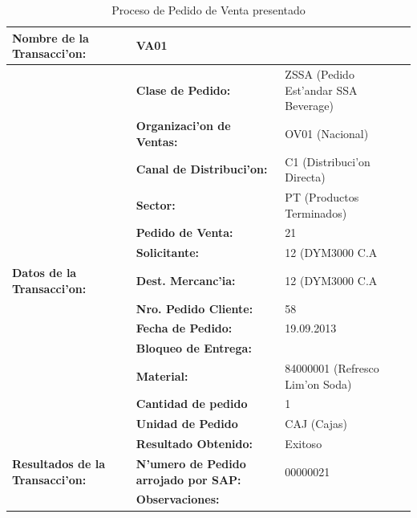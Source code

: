 \begin{table}[H]
\footnotesize
\scalebox{0.8} {
\begin{tabular}{l l l}
\toprule
\textbf{Nombre de la Transacci'on:} & VA01 &\\
\midrule
                 & \textbf{Clase de Pedido:} & ZSSA (Pedido Est'andar SSA Beverage) \\
                 \cmidrule{2-3}
                 & \textbf{Organizaci'on de Ventas:} & OV01 (Nacional) \\
                 \cmidrule{2-3}
                 & \textbf{Canal de Distribuci'on:} & C1 (Distribuci'on Directa) \\
                 \cmidrule{2-3}
                 & \textbf{Sector:}                   &   PT (Productos Terminados) \\
                 \cmidrule{2-3}
                 & \textbf{Pedido de Venta:}            & 21 \\
                 \cmidrule{2-3}
                 & \textbf{Solicitante:}              & 12 (DYM3000 C.A \\
                \cmidrule{2-3}
  \textbf{Datos de la Transacci'on:}              & \textbf{Dest. Mercanc'ia:}   &   12 (DYM3000 C.A \\
                 \cmidrule{2-3}
                 & \textbf{Nro. Pedido Cliente:} & 58      \\
                 \cmidrule{2-3}
                 & \textbf{Fecha de Pedido:} & 19.09.2013 \\
                 \cmidrule{2-3}
                 & \textbf{Bloqueo de Entrega:}  &      \\
                 \cmidrule{2-3}
                 & \textbf{Material:} & 84000001 (Refresco Lim'on Soda) \\
                 \cmidrule{2-3}
                 & \textbf{Cantidad de pedido} & 1 \\
                 \cmidrule{2-3}
                 & \textbf{Unidad de Pedido} & CAJ (Cajas) \\
                 \midrule
                 & \textbf{Resultado Obtenido:} & Exitoso \\
                 \cmidrule{2-3}
\textbf{Resultados de la Transacci'on:}    & \textbf{N'umero de Pedido arrojado por SAP:} & 00000021 \\
                 \cmidrule{2-3}
                 & \textbf{Observaciones:} &  \\
                 \bottomrule
\end{tabular}}
\caption{Proceso de Pedido de Venta presentado}
\label{tb:pedido}
\end{table}
